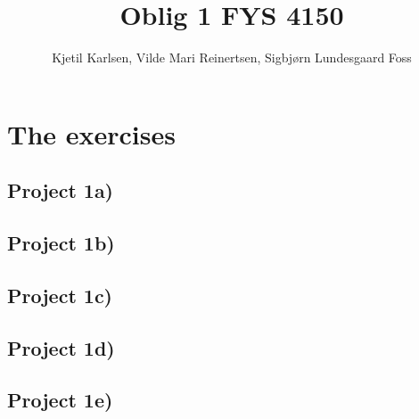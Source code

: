 


\title{Oblig 1 FYS 4150}
\author{Kjetil Karlsen, Vilde Mari Reinertsen, Sigbjørn Lundesgaard Foss}




\maketitle

\section*{The exercises}
\subsection*{Project 1a)}

\subsection*{Project 1b)}

\subsection*{Project 1c)}

\subsection*{Project 1d)}

\subsection*{Project 1e)}



